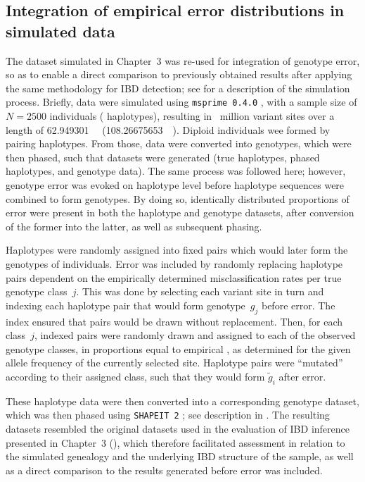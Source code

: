 %
\subsection{Integration of empirical error distributions in simulated data}
%

The dataset simulated in Chapter~3 was re-used for integration of genotype error, so as to enable a direct comparison to previously obtained results after applying the same methodology for IBD detection; see  for a description of the simulation process.
Briefly, data were simulated using \texttt{msprime\,0.4.0} \citep{Kelleher:2016fn}, with a sample size of ${N=\num{2500}}$ individuals (\ie {} haplotypes), resulting in ~million variant sites over a length of \SI{62.949301}{\mega\basepair} (\SI{108.26675653}{\centi\morgan}).
Diploid individuals wee formed by pairing haplotypes.
From those, data were converted into genotypes, which were then phased, such that  datasets were generated (true haplotypes, phased haplotypes, and genotype data).
The same process was followed here; however, genotype error was evoked on haplotype level before haplotype sequences were combined to form genotypes.
By doing so, identically distributed proportions of error were present in both the haplotype and genotype datasets, after conversion of the former into the latter, as well as subsequent phasing.

Haplotypes were randomly assigned into fixed pairs which would later form the genotypes of individuals.
Error was included by randomly replacing haplotype pairs dependent on the empirically determined misclassification rates per true genotype class~$j$.
This was done by selecting each variant site in turn and indexing each haplotype pair that would form genotype~$g_j$ before error.
The index ensured that pairs would be drawn without replacement.
Then, for each class~$j$, indexed pairs were randomly drawn and assigned to each of the  observed genotype classes, in proportions equal to empirical , as determined for the given allele frequency of the currently selected site.
Haplotype pairs were ``mutated'' according to their assigned class, such that they would form $\tilde{g}_i$ after error.

These haplotype data were then converted into a corresponding genotype dataset, which was then phased using \texttt{SHAPEIT\,2} \citep{Delaneau:2008dk,Delaneau:2013hi}; see description in .
The  resulting datasets resembled the original datasets used in the evaluation of IBD inference presented in Chapter~3 (), which therefore facilitated assessment in relation to the simulated genealogy and the underlying IBD structure of the sample, as well as a direct comparison to the results generated before error was included.

